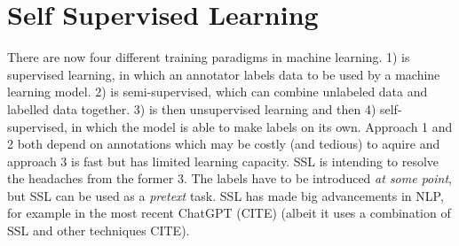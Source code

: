 \documentclass[10pt,twocolumn,letterpaper]{article}
\begin{document}
\section{Self Supervised Learning}\label{sec:ssl}

There are now four different training paradigms in machine learning. 1) is supervised learning, in which an annotator labels data to be used by a machine learning model. 2) is semi-supervised, which can combine unlabeled data and labelled data together. 3) is then unsupervised learning and then 4) self-supervised, in which the model is able to make labels on its own. Approach 1 and 2 both depend on annotations which may be costly (and tedious) to aquire and approach 3 is fast but has limited learning capacity. \gls{SSL} is intending to resolve the headaches from the former 3. The labels have to be introduced \textit{at some point}, but \gls{SSL} can be used as a \textit{pretext} task. \gls{SSL} has made big advancements in \gls{NLP}, for example in the most recent ChatGPT (CITE) (albeit it uses a combination of SSL and other techniques CITE).
\end{document}
